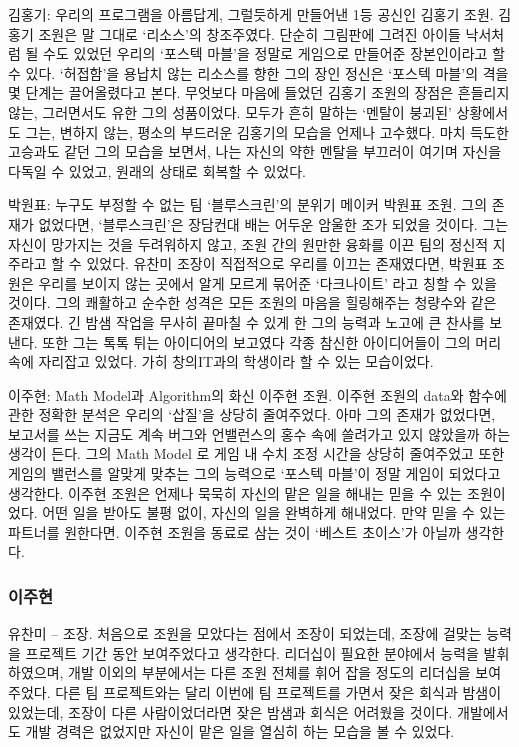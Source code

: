 \documentclass[10pt,oneside,a4paper,titlepage]{article}
\begin{document}
김홍기: 우리의 프로그램을 아름답게, 그럴듯하게 만들어낸 1등 공신인 김홍기 조원. 김홍기 조원은 말 그대로 ‘리소스’의 창조주였다. 단순히 그림판에 그려진 아이들 낙서처럼 될 수도 있었던 우리의 ‘포스텍 마블’을 정말로 게임으로 만들어준 장본인이라고 할 수 있다. ‘허접함’을 용납치 않는 리소스를 향한 그의 장인 정신은 ‘포스텍 마블’의 격을 몇 단계는 끌어올렸다고 본다.
무엇보다 마음에 들었던 김홍기 조원의 장점은 흔들리지 않는, 그러면서도 유한 그의 성품이었다. 모두가 흔히 말하는 ‘멘탈이 붕괴된’ 상황에서도 그는, 변하지 않는, 평소의 부드러운 김홍기의 모습을 언제나 고수했다. 마치 득도한 고승과도 같던 그의 모습을 보면서, 나는 자신의 
약한 멘탈을 부끄러이 여기며 자신을 다독일 수 있었고, 원래의 상태로 회복할 수 있었다.

박원표: 누구도 부정할 수 없는 팀 ‘블루스크린’의 분위기 메이커 박원표 조원. 그의 존재가 없었다면, ‘블루스크린’은 장담컨대 배는 어두운 암울한 조가 되었을 것이다. 그는 자신이 망가지는 것을 두려워하지 않고, 조원 간의 원만한 융화를 이끈 팀의 정신적 지주라고 할 수 있었다. 유찬미 조장이 직접적으로 우리를 이끄는 존재였다면, 박원표 조원은 우리를 보이지 않는 곳에서 알게 모르게 묶어준 ‘다크나이트’ 라고 칭할 수 있을 것이다. 그의 쾌활하고 순수한 성격은 모든 조원의 마음을 힐링해주는 청량수와 같은 존재였다. 긴 밤샘 작업을 무사히 끝마칠 수 있게 한 그의 능력과 노고에 큰 찬사를 보낸다.
또한 그는 톡톡 튀는 아이디어의 보고였다 각종 참신한 아이디어들이 그의 머리 속에 자리잡고 있었다. 가히 창의IT과의 학생이라 할 수 있는 모습이었다.

이주현: Math Model과 Algorithm의 화신 이주현 조원. 이주현 조원의 data와 함수에 관한 정확한 분석은 우리의 ‘삽질’을 상당히 줄여주었다. 아마 그의 존재가 없었다면, 보고서를 쓰는 지금도 계속 버그와 언밸런스의 홍수 속에 쓸려가고 있지 않았을까 하는 생각이 든다. 그의 Math Model 로 게임 내 수치 조정 시간을 상당히 줄여주었고 또한 게임의 밸런스를 알맞게 맞추는 그의 능력으로 ‘포스텍 마블’이 정말 게임이 되었다고 생각한다.  
이주현 조원은 언제나 묵묵히 자신의 맡은 일을 해내는 믿을 수 있는 조원이었다. 어떤 일을 받아도 불평 없이, 자신의 일을 완벽하게 해내었다. 만약 믿을 수 있는 파트너를 원한다면. 이주현 조원을 동료로 삼는 것이 ‘베스트 초이스’가 아닐까 생각한다.


\subsubsection{이주현}

유찬미 – 조장. 처음으로 조원을 모았다는 점에서 조장이 되었는데, 조장에 걸맞는 능력을 프로젝트 기간 동안 보여주었다고 생각한다. 리더십이 필요한 분야에서 능력을 발휘하였으며, 개발 이외의 부분에서는 다른 조원 전체를 휘어 잡을 정도의 리더십을 보여주었다. 다른 팀 프로젝트와는 달리 이번에 팀 프로젝트를 가면서 잦은 회식과 밤샘이 있었는데, 조장이 다른 사람이었더라면 잦은 밤샘과 회식은 어려웠을 것이다. 개발에서도 개발 경력은 없었지만 자신이 맡은 일을 열심히 하는 모습을 볼 수 있었다.
\end{document}
